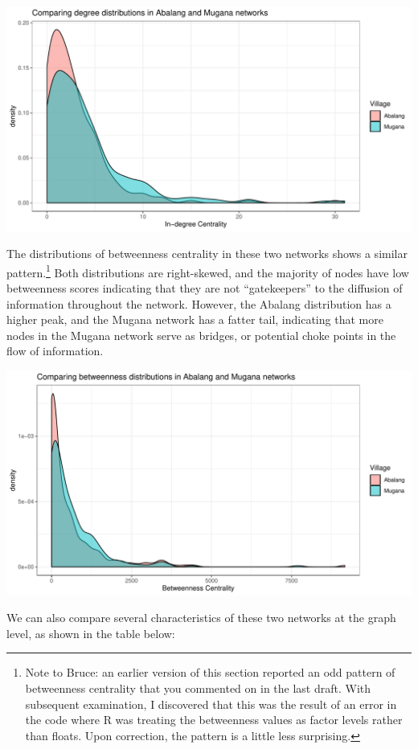 \documentclass[]{article}
\let\rmarkdownfootnote\footnote%
\def\footnote{\protect\rmarkdownfootnote}
\begin{document}
\includegraphics{./figures/degree_comparison.pdf}

The distributions of betweenness centrality in these two networks shows a similar pattern.\footnote{Note to Bruce: an earlier version of this section reported an odd pattern of betweenness centrality that you commented on in the last draft. With subsequent examination, I discovered that this was the result of an error in the code where R was treating the betweenness values as factor levels rather than floats. Upon correction, the pattern is a little less surprising.} Both distributions are right-skewed, and the majority of nodes have low betweenness scores indicating that they are not ``gatekeepers'' to the diffusion of information throughout the network. However, the Abalang distribution has a higher peak, and the Mugana network has a fatter tail, indicating that more nodes in the Mugana network serve as bridges, or potential choke points in the flow of information. 

\includegraphics{./figures/betweenness_comparison.pdf}

We can also compare several characteristics of these two networks at the graph level, as shown in the table below:
\end{document}

